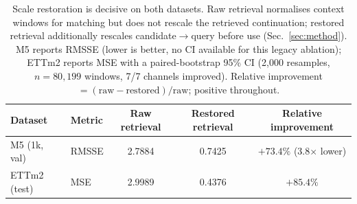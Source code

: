 \begin{table}[t]
  \centering
  \caption{Scale restoration is decisive on both datasets. Raw retrieval normalises context
    windows for matching but does not rescale the retrieved continuation; restored retrieval
    additionally rescales candidate$\to$query before use (Sec.~\ref{sec:method}). M5 reports
    RMSSE (lower is better, no CI available for this legacy ablation); ETTm2 reports MSE with
    a paired-bootstrap 95\% CI (2,000 resamples, $n=80{,}199$ windows, 7/7 channels improved).
    Relative improvement $= (\mathrm{raw} - \mathrm{restored}) / \mathrm{raw}$; positive throughout.}
  \label{tab:ablation}
  \begin{tabular}{@{}llccc@{}}
    \toprule
    Dataset & Metric & Raw retrieval & Restored retrieval & Relative improvement \\
    \midrule
    M5 (1k, val)    & RMSSE & 2.7884 & 0.7425 & $+73.4\%$ (3.8$\times$ lower) \\
    ETTm2 (test)    & MSE   & 2.9989 & 0.4376 & $+85.4\%$ \; [$+85.2\%$, $+85.6\%$] \\
    \bottomrule
  \end{tabular}
\end{table}
